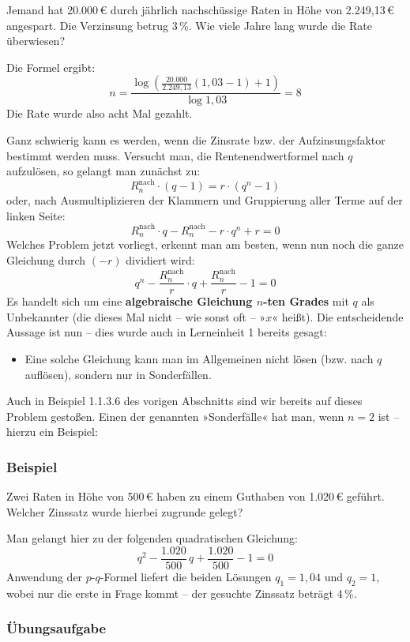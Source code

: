Jemand hat 20.000\,€ durch jährlich nachschüssige Raten in Höhe von 2.249{,}13\,€ angespart. Die Verzinsung betrug 3\,\%. Wie viele Jahre lang wurde die Rate überwiesen?

Die Formel ergibt:
\[ n = \frac{\log\left(\frac{20.000}{2.249{,}13}(1{,}03 - 1) + 1\right)}{\log 1{,}03} = 8 \]
Die Rate wurde also acht Mal gezahlt.\beispielende

Ganz schwierig kann es werden, wenn die Zinsrate bzw. der Aufzinsungsfaktor bestimmt werden muss. Versucht man, die Rentenendwertformel nach $q$ aufzulösen, so gelangt man zunächst zu:
\[ R_n^{\text{nach}} \cdot (q - 1) = r \cdot (q^n - 1) \]
oder, nach Ausmultiplizieren der Klammern und Gruppierung aller Terme auf der linken Seite:
\[ R_n^{\text{nach}} \cdot q - R_n^{\text{nach}} - r \cdot q^n + r = 0 \]
Welches Problem jetzt vorliegt, erkennt man am besten, wenn nun noch die ganze Gleichung durch $(-r)$ dividiert wird:
\[ q^n - \frac{R_n^{\text{nach}}}{r} \cdot q + \frac{R_n^{\text{nach}}}{r} - 1 = 0 \]
Es handelt sich um eine \textbf{algebraische Gleichung $n$-ten Grades} mit $q$ als Unbekannter (die dieses Mal nicht -- wie sonst oft -- »$x$« heißt). Die entscheidende Aussage ist nun -- dies wurde auch in Lerneinheit 1 bereits gesagt:
\begin{itemize}
  \item Eine solche Gleichung kann man im Allgemeinen nicht lösen (bzw. nach $q$ auflösen), sondern nur in Sonderfällen.
\end{itemize}

Auch in Beispiel 1.1.3.6 des vorigen Abschnitts sind wir bereits auf dieses Problem gestoßen. Einen der genannten »Sonderfälle« hat man, wenn $n = 2$ ist -- hierzu ein Beispiel:

\subsubsection{Beispiel}

Zwei Raten in Höhe von 500\,€ haben zu einem Guthaben von 1.020\,€ geführt. Welcher Zinssatz wurde hierbei zugrunde gelegt?

Man gelangt hier zu der folgenden quadratischen Gleichung:
\[ q^2 - \frac{1.020}{500}\, q + \frac{1.020}{500} - 1 = 0 \]
Anwendung der $p$-$q$-Formel liefert die beiden Lösungen $q_1 = 1{,}04$ und $q_2 = 1$, wobei nur die erste in Frage kommt -- der gesuchte Zinssatz beträgt 4\,\%.\beispielende

\subsubsection{Übungsaufgabe}

